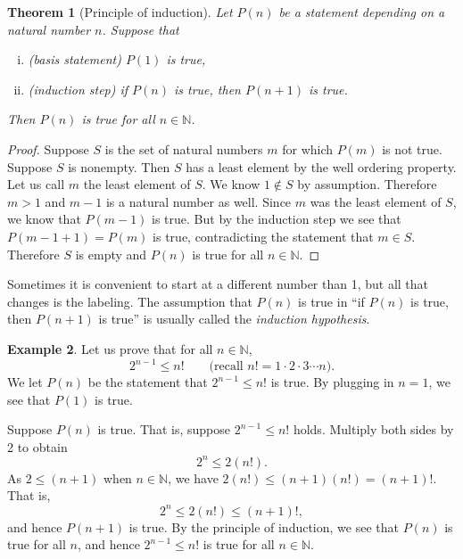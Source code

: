\documentclass[12pt]{book}
\newcommand{\N}{{\mathbb{N}}}
\newcommand{\myindex}[1]{#1\index{#1}}
\theoremstyle{plain}
\newtheorem{thm}{Theorem}[section]
\theoremstyle{remark}
\theoremstyle{definition}
\theoremstyle{exercise}
\theoremstyle{example}
\newtheorem{example}[thm]{Example}
\begin{document}
\begin{thm}[Principle of induction] \label{induction:thm}
Let $P(n)$ be a statement depending on a natural number $n$.  Suppose that
\begin{enumerate}[(i)]
\item \emph{(basis statement)} $P(1)$ is true,
\item \emph{(induction step)} if $P(n)$ is true, then $P(n+1)$ is true.
\end{enumerate}
Then $P(n)$ is true for all $n \in \N$.
\end{thm}

\begin{proof}
Suppose $S$ is the set of natural numbers $m$ for which $P(m)$ is
not true.  Suppose
$S$ is nonempty.  Then $S$ has a least element by the well ordering
property.  Let us call $m$ the least element of $S$.  We know $1 \notin
S$ by assumption.  Therefore $m > 1$ and $m-1$ is a natural number as well.
Since $m$ was the least element of $S$, we know that $P(m-1)$ is true.
But by the induction step we see that $P(m-1+1) = P(m)$ is true, 
contradicting the statement that $m \in S$.  Therefore $S$ is empty and 
$P(n)$ is true for all $n \in \N$.
\end{proof}

Sometimes it is convenient to start at a different number than 1, but 
all that changes is the labeling.  The assumption that
$P(n)$ is true in ``if $P(n)$ is true,
then $P(n+1)$ is true''
is usually called the \emph{\myindex{induction hypothesis}}.

\begin{example}
Let us prove that for all $n \in \N$,
\begin{equation*}
2^{n-1} \leq n! \qquad \text{(recall $n! = 1 \cdot 2 \cdot 3 \cdots n$)}.
\end{equation*}
We let $P(n)$ be the statement that
$2^{n-1} \leq n!$ is true.  By plugging in $n=1$, we see that $P(1)$
is true.

Suppose $P(n)$ is true.  That is, suppose 
$2^{n-1} \leq n!$ holds.  Multiply both sides by 2 to obtain
\begin{equation*}
2^n \leq 2(n!) .
\end{equation*}
As $2 \leq (n+1)$ when $n \in \N$, we have
$2(n!) \leq (n+1)(n!) = (n+1)!$.  That is,
\begin{equation*}
2^n \leq 2(n!) \leq  (n+1)!,
\end{equation*}
and hence $P(n+1)$ is true.  By the principle of induction, we see that
$P(n)$
is true for all $n$, and hence
$2^{n-1} \leq n!$ is true for all $n \in \N$.
\end{example}
\end{document}
